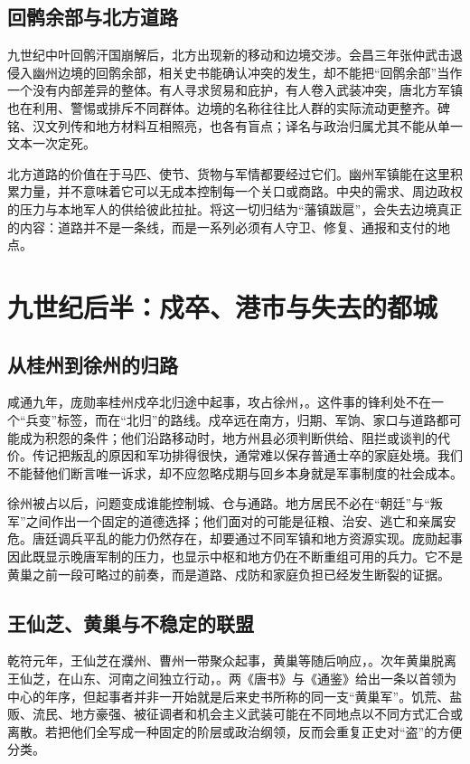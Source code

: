 \subsection{回鹘余部与北方道路}
九世纪中叶回鹘汗国崩解后，北方出现新的移动和边境交涉。会昌三年张仲武击退侵入幽州边境的回鹘余部，相关史书能确认冲突的发生，却不能把“回鹘余部”当作一个没有内部差异的整体。有人寻求贸易和庇护，有人卷入武装冲突，唐北方军镇也在利用、警惕或排斥不同群体。边境的名称往往比人群的实际流动更整齐。碑铭、汉文列传和地方材料互相照亮，也各有盲点；译名与政治归属尤其不能从单一文本一次定死。

北方道路的价值在于马匹、使节、货物与军情都要经过它们。幽州军镇能在这里积累力量，并不意味着它可以无成本控制每一个关口或商路。中央的需求、周边政权的压力与本地军人的供给彼此拉扯。将这一切归结为“藩镇跋扈”，会失去边境真正的内容：道路并不是一条线，而是一系列必须有人守卫、修复、通报和支付的地点。

\section{九世纪后半：戍卒、港市与失去的都城}

\subsection{从桂州到徐州的归路}
咸通九年，庞勋率桂州戍卒北归途中起事，攻占徐州，。这件事的锋利处不在一个“兵变”标签，而在“北归”的路线。戍卒远在南方，归期、军饷、家口与道路都可能成为积怨的条件；他们沿路移动时，地方州县必须判断供给、阻拦或谈判的代价。传记把叛乱的原因和军功排得很快，通常难以保存普通士卒的家庭处境。我们不能替他们断言唯一诉求，却不应忽略戍期与回乡本身就是军事制度的社会成本。

徐州被占以后，问题变成谁能控制城、仓与通路。地方居民不必在“朝廷”与“叛军”之间作出一个固定的道德选择；他们面对的可能是征粮、治安、逃亡和亲属安危。唐廷调兵平乱的能力仍然存在，却要通过不同军镇和地方资源实现。庞勋起事因此既显示晚唐军制的压力，也显示中枢和地方仍在不断重组可用的兵力。它不是黄巢之前一段可略过的前奏，而是道路、戍防和家庭负担已经发生断裂的证据。

\subsection{王仙芝、黄巢与不稳定的联盟}
乾符元年，王仙芝在濮州、曹州一带聚众起事，黄巢等随后响应，。次年黄巢脱离王仙芝，在山东、河南之间独立行动，。两《唐书》与《通鉴》给出一条以首领为中心的年序，但起事者并非一开始就是后来史书所称的同一支“黄巢军”。饥荒、盐贩、流民、地方豪强、被征调者和机会主义武装可能在不同地点以不同方式汇合或离散。若把他们全写成一种固定的阶层或政治纲领，反而会重复正史对“盗”的方便分类。

